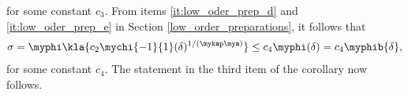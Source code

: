 \documentclass[10pt]{article}
\newtheorem{corollary}[theorem]{Corollary}
\theoremstyle{definition}
\begin{document}
%
for some constant $ c_3 $.
%
From items \ref{it:low_oder_prep_d} and \ref{it:low_oder_prep_e} in Section
\ref{low_order_preparations}, it follows that
%
\begin{align*}
\sigma = \myphi\kla{c_2 \mychi{-1}{1}(\delta)^{1/(\mykap\mya)}}
\le c_4 \myphi(\delta) = c_4 \myphib{\delta},
\end{align*}
%
for some constant $ c_4 $.
The statement in the third item of the corollary now follows.
%
\proofend
%
%
\begin{comment}
\begin{corollary}
\label{th:upardel_cor}
\mainassump
There exist finite positive constants $ \para_0, \delta_0 $
and $K_2$
such that for $ 0 < \para \le \para_0 $ and each $0 \le \delta \le \delta_0$, we have
%
$$ \norma{\upardel -\ust} \le f_3(\para)\para^{\mykap} + K_2 \delta.$$
Here $f_3(\para), 0 < \para \le \para_0 $, is a bounded function which satisfies the following:
%
\begin{mylist_indent}
\item (No explicit smoothness)
If $ \ust \in \overline{\R(G)} $, then $ f_3(\para) \to 0 $ as $ \para \to 0 $.
\item (H\"older smoothness)
If $ \ust \in \ix_\pp $ for some $ 0 < \pp \le 1 $, then
$ f_3(\para) = \Landauno{\para^{\mykap p}} $ as $ \para \to 0 $.
\item (Low order smoothness)
If $ \ust \in \domain(\log \G) $, then
$ f_3(\para) = \Landauno{\loginv{\frac{1}{\para}}} $ as $ \para \to 0 $.
\end{mylist_indent}
\end{corollary}
%
\proof
Let $ \para $ and $ \delta $ be small enough, say
$ 0 < \para \le \para_0 $ and $ 0 < \delta \le \delta_0 $.
From estimate \refeq{normequiv_b} and Lemma \ref{th:upardel_lemma},
it then follows
%
\begin{align*}
& \ca \norma{\upardel -\ust} \le \normyps{\myF{\upardel} - \fst } \le
\normyps{\myF{\upardel} - \fdel } + \delta
\le f_2(\para)\,\para^{\mykap a} + (1+\er)\delta.
\end{align*}
%
The assertion of the corollary now follows by setting $f_3(\para):=\tfrac{f_2(\para)}{\ca}$ and $K_2:=\tfrac{1+\er}{\ca}.$
\proofend
\end{comment}
\end{document}
